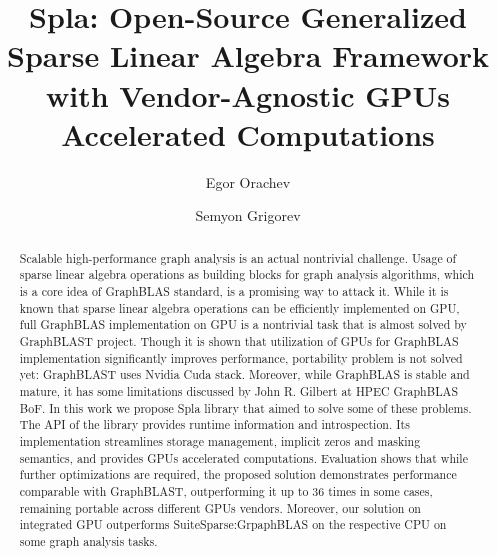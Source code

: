 \documentclass[sigconf, anonymous, review,table]{acmart}
\begin{document}
\title[Generalized Sparse Linear Algebra Framework with Vendor-Agnostic GPUs Accelerated Computations]{Spla: Open-Source Generalized Sparse Linear Algebra Framework with Vendor-Agnostic GPUs Accelerated Computations}

\author{Egor Orachev}
\author{Semyon Grigorev}



\renewcommand{\shortauthors}{Orachev, Grigorev}


\begin{abstract}
    Scalable high-performance graph analysis is an actual nontrivial challenge. Usage of sparse linear algebra operations as building blocks for graph analysis algorithms, which is a core idea of GraphBLAS standard, is a promising way to attack it.
    While it is known that sparse linear algebra operations can be efficiently implemented on GPU, full GraphBLAS implementation on GPU is a nontrivial task that is almost solved by GraphBLAST project. Though it is shown that utilization of GPUs for GraphBLAS implementation significantly improves performance, portability problem is not solved yet: GraphBLAST uses Nvidia Cuda stack. 
    Moreover, while GraphBLAS is stable and mature, it has some limitations discussed by John R. Gilbert at HPEC GraphBLAS BoF. 
    In this work we propose Spla library that aimed to solve some of these problems. The API of the library provides runtime information and introspection. Its implementation streamlines storage management, implicit zeros and masking semantics, and provides GPUs accelerated computations.
    Evaluation shows that while further optimizations are required, the proposed solution demonstrates performance comparable with GraphBLAST, outperforming it up to 36 times in some cases, remaining portable across different GPUs vendors. Moreover, our solution on integrated GPU outperforms SuiteSparse:GrpaphBLAS on the respective CPU on some graph analysis tasks.
\end{abstract}
\end{document}
